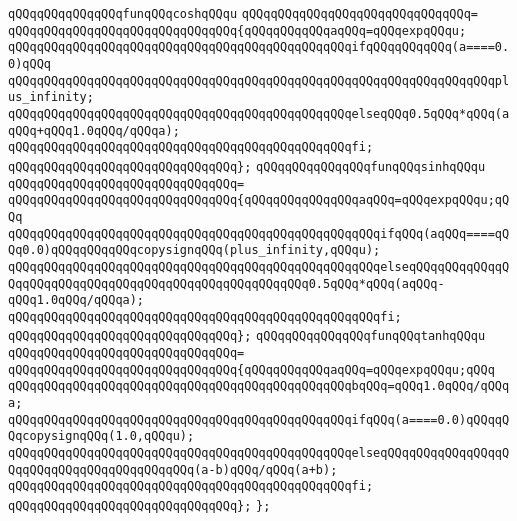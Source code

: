 \newline
\verb|qQQqqQQqqQQqqQQqfunqQQqcoshqQQqu|\newline
\verb|qQQqqQQqqQQqqQQqqQQqqQQqqQQqqQQq=|\newline
\verb|qQQqqQQqqQQqqQQqqQQqqQQqqQQqqQQq{qQQqqQQqqQQqaqQQq=qQQqexpqQQqu;|\newline
\newline
\verb|qQQqqQQqqQQqqQQqqQQqqQQqqQQqqQQqqQQqqQQqqQQqqQQqifqQQqqQQqqQQq(a====0.0)qQQq|\newline
\verb|qQQqqQQqqQQqqQQqqQQqqQQqqQQqqQQqqQQqqQQqqQQqqQQqqQQqqQQqqQQqqQQqqQQqplus_infinity;|\newline
\verb|qQQqqQQqqQQqqQQqqQQqqQQqqQQqqQQqqQQqqQQqqQQqqQQqelseqQQq0.5qQQq*qQQq(aqQQq+qQQq1.0qQQq/qQQqa);|\newline
\verb|qQQqqQQqqQQqqQQqqQQqqQQqqQQqqQQqqQQqqQQqqQQqqQQqfi;|\newline
\verb|qQQqqQQqqQQqqQQqqQQqqQQqqQQqqQQq};|\newline
\newline
\verb|qQQqqQQqqQQqqQQqfunqQQqsinhqQQqu|\newline
\verb|qQQqqQQqqQQqqQQqqQQqqQQqqQQqqQQq=|\newline
\verb|qQQqqQQqqQQqqQQqqQQqqQQqqQQqqQQq{qQQqqQQqqQQqqQQqaqQQq=qQQqexpqQQqu;qQQq|\newline
\newline
\verb|qQQqqQQqqQQqqQQqqQQqqQQqqQQqqQQqqQQqqQQqqQQqqQQqqQQqifqQQq(aqQQq====qQQq0.0)qQQqqQQqqQQqcopysignqQQq(plus_infinity,qQQqu);|\newline
\verb|qQQqqQQqqQQqqQQqqQQqqQQqqQQqqQQqqQQqqQQqqQQqqQQqqQQqelseqQQqqQQqqQQqqQQqqQQqqQQqqQQqqQQqqQQqqQQqqQQqqQQqqQQqqQQq0.5qQQq*qQQq(aqQQq-qQQq1.0qQQq/qQQqa);|\newline
\verb|qQQqqQQqqQQqqQQqqQQqqQQqqQQqqQQqqQQqqQQqqQQqqQQqqQQqfi;|\newline
\verb|qQQqqQQqqQQqqQQqqQQqqQQqqQQqqQQq};|\newline
\newline
\verb|qQQqqQQqqQQqqQQqfunqQQqtanhqQQqu|\newline
\verb|qQQqqQQqqQQqqQQqqQQqqQQqqQQqqQQq=|\newline
\verb|qQQqqQQqqQQqqQQqqQQqqQQqqQQqqQQq{qQQqqQQqqQQqaqQQq=qQQqexpqQQqu;qQQq|\newline
\verb|qQQqqQQqqQQqqQQqqQQqqQQqqQQqqQQqqQQqqQQqqQQqqQQqbqQQq=qQQq1.0qQQq/qQQqa;|\newline
\newline
\verb|qQQqqQQqqQQqqQQqqQQqqQQqqQQqqQQqqQQqqQQqqQQqqQQqifqQQq(a====0.0)qQQqqQQqcopysignqQQq(1.0,qQQqu);|\newline
\verb|qQQqqQQqqQQqqQQqqQQqqQQqqQQqqQQqqQQqqQQqqQQqqQQqelseqQQqqQQqqQQqqQQqqQQqqQQqqQQqqQQqqQQqqQQqqQQq(a-b)qQQq/qQQq(a+b);|\newline
\verb|qQQqqQQqqQQqqQQqqQQqqQQqqQQqqQQqqQQqqQQqqQQqqQQqfi;|\newline
\verb|qQQqqQQqqQQqqQQqqQQqqQQqqQQqqQQq};|\newline
\verb|};|\newline
\newline
\newline
\newline

